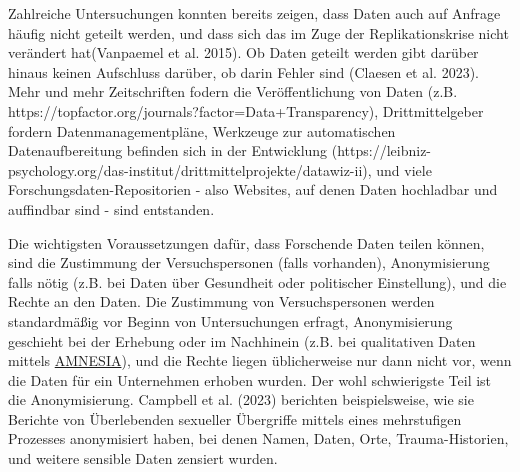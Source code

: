 \documentclass[
  letterpaper,
  DIV=11,
  numbers=noendperiod]{scrreprt}
\begin{document}
Zahlreiche Untersuchungen konnten bereits zeigen, dass Daten auch auf
Anfrage häufig nicht geteilt werden, und dass sich das im Zuge der
Replikationskrise nicht verändert hat(Vanpaemel et al. 2015). Ob Daten
geteilt werden gibt darüber hinaus keinen Aufschluss darüber, ob darin
Fehler sind (Claesen et al. 2023). Mehr und mehr Zeitschriften fodern
die Veröffentlichung von Daten (z.B.
https://topfactor.org/journals?factor=Data+Transparency),
Drittmittelgeber fordern Datenmanagementpläne, Werkzeuge zur
automatischen Datenaufbereitung befinden sich in der Entwicklung
(https://leibniz-psychology.org/das-institut/drittmittelprojekte/datawiz-ii),
und viele Forschungsdaten-Repositorien - also Websites, auf denen Daten
hochladbar und auffindbar sind - sind entstanden.

Die wichtigsten Voraussetzungen dafür, dass Forschende Daten teilen
können, sind die Zustimmung der Versuchspersonen (falls vorhanden),
Anonymisierung falls nötig (z.B. bei Daten über Gesundheit oder
politischer Einstellung), und die Rechte an den Daten. Die Zustimmung
von Versuchspersonen werden standardmäßig vor Beginn von Untersuchungen
erfragt, Anonymisierung geschieht bei der Erhebung oder im Nachhinein
(z.B. bei qualitativen Daten mittels
\href{https://amnesia.openaire.eu}{AMNESIA}), und die Rechte liegen
üblicherweise nur dann nicht vor, wenn die Daten für ein Unternehmen
erhoben wurden. Der wohl schwierigste Teil ist die Anonymisierung.
Campbell et al. (2023) berichten beispielsweise, wie sie Berichte von
Überlebenden sexueller Übergriffe mittels eines mehrstufigen Prozesses
anonymisiert haben, bei denen Namen, Daten, Orte, Trauma-Historien, und
weitere sensible Daten zensiert wurden.
\end{document}
